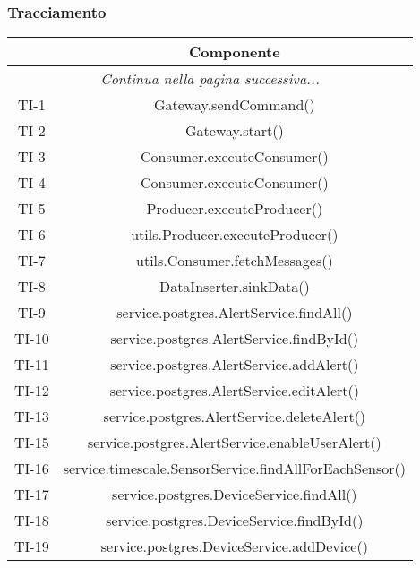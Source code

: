 	\subsubsection{Tracciamento}
		\begin{center}
			\begin{longtable}{|c|c|}
			\hline
			\rowcolor{lighter-grayer}{ \textbf{Codice} } & {\textbf{Componente} } \\ \hline
			\endhead
			\multicolumn{2}{|c|}{\textit{Continua nella pagina successiva...}}\\
			\hline
			\hline
			\endfoot
			\endlastfoot

			\hline
			TI-1 & Gateway.sendCommand() \\
			\hline
			TI-2 & Gateway.start() \\
			\hline
			TI-3 & Consumer.executeConsumer() \\
			\hline
			TI-4 & Consumer.executeConsumer() \\
			\hline
			TI-5 & Producer.executeProducer() \\
			\hline
			TI-6 & utils.Producer.executeProducer() \\
			\hline
			TI-7 & utils.Consumer.fetchMessages() \\
			\hline
			TI-8 & DataInserter.sinkData() \\
			\hline
			TI-9 & service.postgres.AlertService.findAll() \\
			\hline
			TI-10 & service.postgres.AlertService.findById() \\
			\hline
			TI-11 & service.postgres.AlertService.addAlert() \\
			\hline
			TI-12 & service.postgres.AlertService.editAlert() \\
			\hline
			TI-13 & service.postgres.AlertService.deleteAlert() \\
			\hline
			TI-15 & service.postgres.AlertService.enableUserAlert() \\
			\hline
			TI-16 & service.timescale.SensorService.findAllForEachSensor() \\
			\hline
			TI-17 & service.postgres.DeviceService.findAll() \\
			\hline
			TI-18 & service.postgres.DeviceService.findById() \\
			\hline
			TI-19 & service.postgres.DeviceService.addDevice() \\

\end{longtable}
\end{center}
